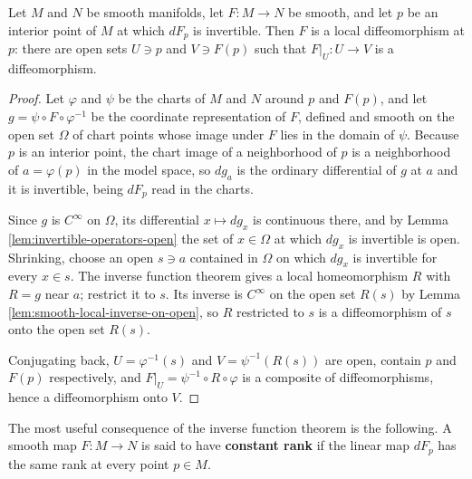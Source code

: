 \begin{lemma}
\label{lem:local-diffeomorphism-from-invertible-differential}





Let $M$ and $N$ be smooth manifolds, let $F : M \to N$ be smooth, and let $p$ be an interior point of $M$ at which $dF_p$ is invertible. Then $F$ is a local diffeomorphism at $p$: there are open sets $U \ni p$ and $V \ni F(p)$ such that $F|_U : U \to V$ is a diffeomorphism.
\end{lemma}

\begin{proof}

Let $\varphi$ and $\psi$ be the charts of $M$ and $N$ around $p$ and $F(p)$, and let $g = \psi \circ F \circ \varphi^{-1}$ be the coordinate representation of $F$, defined and smooth on the open set $\Omega$ of chart points whose image under $F$ lies in the domain of $\psi$. Because $p$ is an interior point, the chart image of a neighborhood of $p$ is a neighborhood of $a = \varphi(p)$ in the model space, so $dg_a$ is the ordinary differential of $g$ at $a$ and it is invertible, being $dF_p$ read in the charts.

Since $g$ is $C^\infty$ on $\Omega$, its differential $x \mapsto dg_x$ is continuous there, and by Lemma \ref{lem:invertible-operators-open} the set of $x \in \Omega$ at which $dg_x$ is invertible is open. Shrinking, choose an open $s \ni a$ contained in $\Omega$ on which $dg_x$ is invertible for every $x \in s$. The inverse function theorem gives a local homeomorphism $R$ with $R = g$ near $a$; restrict it to $s$. Its inverse is $C^\infty$ on the open set $R(s)$ by Lemma \ref{lem:smooth-local-inverse-on-open}, so $R$ restricted to $s$ is a diffeomorphism of $s$ onto the open set $R(s)$.

Conjugating back, $U = \varphi^{-1}(s)$ and $V = \psi^{-1}(R(s))$ are open, contain $p$ and $F(p)$ respectively, and $F|_U = \psi^{-1} \circ R \circ \varphi$ is a composite of diffeomorphisms, hence a diffeomorphism onto $V$.
\end{proof}

The most useful consequence of the inverse function theorem is the following. A smooth map $F: M \to N$ is said to have \textbf{constant rank} if the linear map $dF_p$ has the same rank at every point $p \in M$.

